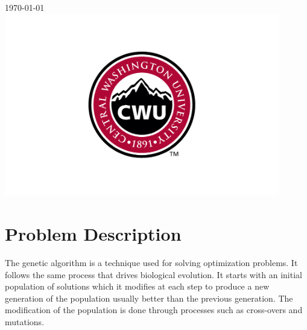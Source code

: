 \documentclass[12pt]{article}
\begin{document}
\begin{titlepage}
		
		
		{\large \today}\\ %
		
		
		\includegraphics[width=12cm]{CWU-Logo.png}\\[.5cm] %
		
		
		\vfill %
		
	\end{titlepage}
	\newpage
	\tableofcontents
	\newpage
	
	
	
	\section{Problem Description}
	The genetic algorithm is a technique used for solving optimization problems. It follows the same process that drives biological evolution. It starts with an initial population of solutions which it modifies at each step to produce a new generation of the population usually better than the previous generation. The modification of the population is done through processes such as cross-overs and mutations.
	
\end{document}
